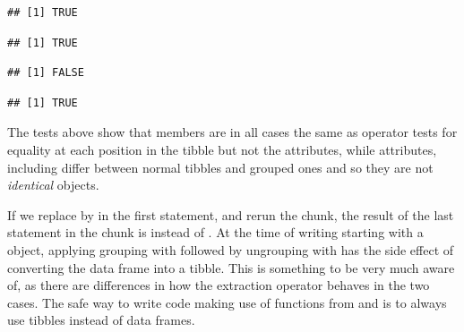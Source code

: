 \documentclass[krantz2]{krantz}\usepackage{knitr}
\begin{document}
\begin{warningbox}
\begin{knitrout}\footnotesize
{}\color{fgcolor}\begin{kframe}
\begin{alltt}
 \hlopt{==} 
\end{alltt}
\begin{verbatim}
## [1] TRUE
\end{verbatim}
\begin{alltt}
 \hlopt{==} 
\end{alltt}
\begin{verbatim}
## [1] TRUE
\end{verbatim}
\begin{alltt}
\end{alltt}
\begin{verbatim}
## [1] FALSE
\end{verbatim}
\begin{alltt}
\end{alltt}
\begin{verbatim}
## [1] TRUE
\end{verbatim}
\end{kframe}
\end{knitrout}

The tests above show that members are in all cases the same as operator \Roperator{==} tests for equality at each position in the tibble but not the attributes, while attributes, including  differ between normal tibbles and grouped ones and so they are not \emph{identical} objects.

If we replace  by  in the first statement, and rerun the chunk, the result of the last statement in the chunk is  instead of . At the time of writing starting with a  object, applying grouping with  followed by ungrouping with  has the side effect of converting the data frame into a tibble. This is something to be very much aware of, as there are differences in how the extraction operator \Roperator{[ , ]} behaves in the two cases. The safe way to write code making use of functions from  and  is to always use tibbles instead of data frames.
\end{warningbox}
\end{document}
